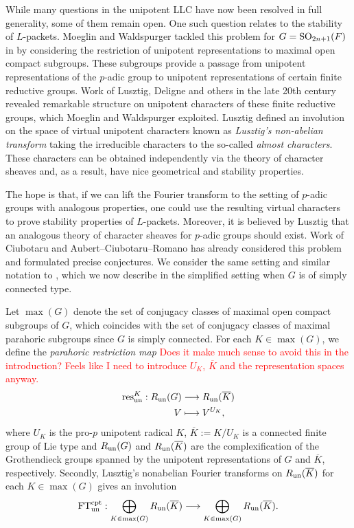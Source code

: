 While many questions in the unipotent LLC have now been resolved in full generality, some of them remain open. One such question relates to the stability of $L$-packets. Moeglin and Waldspurger tackled this problem for $G=\mathrm{SO}_{2n+1}(F)$ in \cite{MoglinWaldspurger2003} by considering the restriction of unipotent representations to maximal open compact subgroups. These subgroups provide a passage from unipotent representations of the $p$-adic group to unipotent representations of certain finite reductive groups. Work of Lusztig, Deligne and others in the late 20th century revealed remarkable structure on unipotent characters of these finite reductive groups, which Moeglin and Waldspurger exploited. Lusztig defined an involution on the space of virtual unipotent characters known as \textit{Lusztig's non-abelian transform} taking the irreducible characters to the so-called \textit{almost characters}. These characters can be obtained independently via the theory of character sheaves and, as a result, have nice geometrical and stability properties. 

The hope is that, if we can lift the Fourier transform to the setting of $p$-adic groups with analogous properties, one could use the resulting virtual characters to prove stability properties of $L$-packets. Moreover, it is believed by Lusztig that an analogous theory of character sheaves for $p$-adic groups should exist. Work of Ciubotaru \cite{Ciubotaru2020} and Aubert--Ciubotaru--Romano \cite{AubertCiubotaruRomano2024} has already considered this problem and formulated precise conjectures. We consider the same setting and similar notation to \cite{AubertCiubotaruRomano2024}, which we now describe in the simplified setting when $G$ is of simply connected type. 

Let $\max(G)$ denote the set of conjugacy classes of maximal open compact subgroups of $G$, which coincides with the set of conjugacy classes of maximal parahoric subgroups since $G$ is simply connected. For each $K\in\max(G)$, we define the \textit{parahoric restriction map} \textcolor{red}{Does it make much sense to avoid this in the introduction? Feels like I need to introduce $U_K$, $\overline{K}$ and the representation spaces anyway.}
\begin{align*}
    \mathrm{res}_{\mathrm{un}}^{K}:R_{\mathrm{un}}(G)&\longrightarrow R_{\mathrm{un}}(\overline{K})\\
    V&\longmapsto V^{U_K},
\end{align*}
where $U_K$ is the pro-$p$ unipotent radical $K$, $\overline{K}:=K/U_K$ is a connected finite group of Lie type and $R_{\mathrm{un}}(G)$ and $R_{\mathrm{un}}(\overline{K})$ are the complexification of the Grothendieck groups spanned by the unipotent representations of $G$ and $\overline{K}$, respectively. Secondly, Lusztig's nonabelian Fourier transforms on $R_{\mathrm{un}}(\overline{K})$ for each $K\in\max(G)$ gives an involution 
\begin{equation*}
    \mathrm{FT}^{\mathrm{cpt}}_{\mathrm{un}}:\bigoplus_{K\in\max(G)}R_{\mathrm{un}}(\overline{K})\longrightarrow\bigoplus_{K\in\max(G)}R_{\mathrm{un}}(\overline{K}).
\end{equation*}

